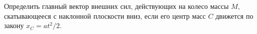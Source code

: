 Определить главный вектор внешних сил, действующих на колесо массы $M$,
скатывающееся с наклонной плоскости вниз,
если его центр масс $C$ движется по закону $x_C = at^2/2$.
